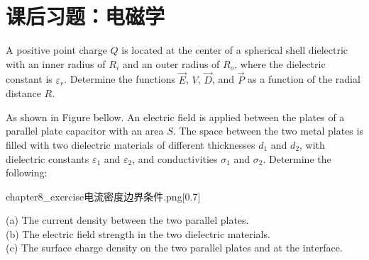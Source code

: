 \section{课后习题：电磁学}
\begin{example}
    A positive point charge $Q$ is located at the center of a spherical shell dielectric with an inner radius of $R_i$ and an outer radius of $R_o$, 
    where the dielectric constant is $\varepsilon_r$. Determine the functions $\vec{E}$, $V$, $\vec{D}$, and $\vec{P}$ as a function of the radial distance $R$.
\end{example}
\begin{example}
    As shown in Figure bellow. An electric field is applied between the plates of a parallel plate capacitor with an area \( S \). The space between the two metal plates 
    is filled with two dielectric materials of different thicknesses \( d_1 \) and \( d_2 \), with dielectric constants \( \varepsilon_1 \) and \( \varepsilon_2 \), 
    and conductivities \( \sigma_1 \) and \( \sigma_2 \). Determine the following:
    \begin{singlefigure}{chapter8_exercise电流密度边界条件.png}[0.7]
    \end{singlefigure}

    (a) The current density between the two parallel plates.\\
    (b) The electric field strength in the two dielectric materials.\\
    (c) The surface charge density on the two parallel plates and at the interface.
\end{example}
